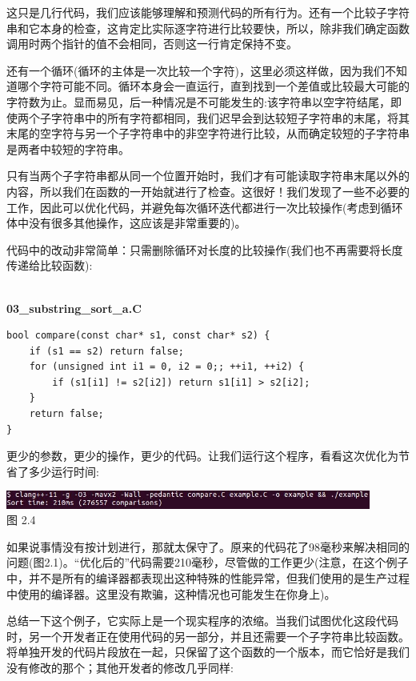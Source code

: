这只是几行代码，我们应该能够理解和预测代码的所有行为。还有一个比较子字符串和它本身的检查，这肯定比实际逐字符进行比较要快，所以，除非我们确定函数调用时两个指针的值不会相同，否则这一行肯定保持不变。

还有一个循环(循环的主体是一次比较一个字符)，这里必须这样做，因为我们不知道哪个字符可能不同。循环本身会一直运行，直到找到一个差值或比较最大可能的字符数为止。显而易见，后一种情况是不可能发生的:该字符串以空字符结尾，即使两个子字符串中的所有字符都相同，我们迟早会到达较短子字符串的末尾，将其末尾的空字符与另一个子字符串中的非空字符进行比较，从而确定较短的子字符串是两者中较短的字符串。

只有当两个子字符串都从同一个位置开始时，我们才有可能读取字符串末尾以外的内容，所以我们在函数的一开始就进行了检查。这很好！我们发现了一些不必要的工作，因此可以优化代码，并避免每次循环迭代都进行一次比较操作(考虑到循环体中没有很多其他操作，这应该是非常重要的)。

代码中的改动非常简单：只需删除循环对长度的比较操作(我们也不再需要将长度传递给比较函数):

\hspace*{\fill} \\ %
\noindent
\textbf{03\_substring\_sort\_a.C}
\begin{lstlisting}[style=styleCXX]
bool compare(const char* s1, const char* s2) {
	if (s1 == s2) return false;
	for (unsigned int i1 = 0, i2 = 0;; ++i1, ++i2) {
		if (s1[i1] != s2[i2]) return s1[i1] > s2[i2];
	}
	return false;
}
\end{lstlisting}

更少的参数，更少的操作，更少的代码。让我们运行这个程序，看看这次优化为节省了多少运行时间:

\begin{center}
\includegraphics[width=0.9\textwidth]{content/1/chapter2/images/4.jpg}\\
图 2.4
\end{center}

如果说事情没有按计划进行，那就太保守了。原来的代码花了98毫秒来解决相同的问题(图2.1)。“优化后的”代码需要210毫秒，尽管做的工作更少(注意，在这个例子中，并不是所有的编译器都表现出这种特殊的性能异常，但我们使用的是生产过程中使用的编译器。这里没有欺骗，这种情况也可能发生在你身上)。

总结一下这个例子，它实际上是一个现实程序的浓缩。当我们试图优化这段代码时，另一个开发者正在使用代码的另一部分，并且还需要一个子字符串比较函数。将单独开发的代码片段放在一起，只保留了这个函数的一个版本，而它恰好是我们没有修改的那个；其他开发者的修改几乎同样:

